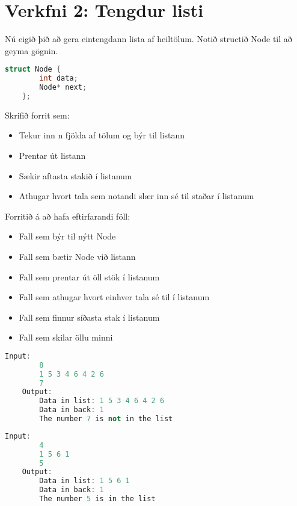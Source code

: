 \documentclass[11pt,a4paper]{article}
\begin{document}
\section*{Verkfni 2: Tengdur listi}
Nú eigið þið að gera eintengdann lista af heiltölum. Notið structið Node til að geyma gögnin.

\begin{lstlisting}[language=C++, caption = Example]
	struct Node {
		int data;
		Node* next;
	};
\end{lstlisting}

Skrifið forrit sem:
\begin{itemize}
	\item Tekur inn n fjölda af tölum og býr til listann
	\item Prentar út listann
	\item Sækir aftasta stakið í listanum
	\item Athugar hvort tala sem notandi slær inn sé til staðar í listanum
\end{itemize}

Forritið á að hafa eftirfarandi föll:
\begin{itemize}
	\item Fall sem býr til nýtt Node
	\item Fall sem bætir Node við listann
	\item Fall sem prentar út öll stök í listanum
	\item Fall sem athugar hvort einhver tala sé til í listanum
	\item Fall sem finnur síðasta stak í listanum
	\item Fall sem skilar öllu minni
\end{itemize}

\begin{lstlisting}[language=C++, caption=Dæmi um input og output]
	Input:
		8
		1 5 3 4 6 4 2 6
		7
	Output:
		Data in list: 1 5 3 4 6 4 2 6
		Data in back: 1
		The number 7 is not in the list
\end{lstlisting}
\begin{lstlisting}[language=C++, caption=Dæmi um input og output]
	Input:
		4
		1 5 6 1
		5
	Output:
		Data in list: 1 5 6 1
		Data in back: 1
		The number 5 is in the list
		
\end{lstlisting}
\end{document}
